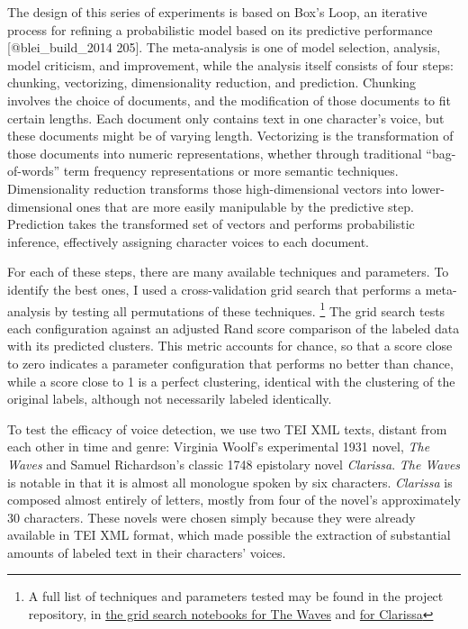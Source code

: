 \documentclass[12pt]{article}
\begin{document}
The design of this series of experiments is based on Box's Loop, an
iterative process for refining a probabilistic model based on its
predictive performance {[}@blei\_build\_2014 205{]}. The meta-analysis
is one of model selection, analysis, model criticism, and improvement,
while the analysis itself consists of four steps: chunking, vectorizing,
dimensionality reduction, and prediction. Chunking involves the choice
of documents, and the modification of those documents to fit certain
lengths. Each document only contains text in one character's voice, but
these documents might be of varying length. Vectorizing is the
transformation of those documents into numeric representations, whether
through traditional ``bag-of-words'' term frequency representations or
more semantic techniques. Dimensionality reduction transforms those
high-dimensional vectors into lower-dimensional ones that are more
easily manipulable by the predictive step. Prediction takes the
transformed set of vectors and performs probabilistic inference,
effectively assigning character voices to each document.

For each of these steps, there are many available techniques and
parameters. To identify the best ones, I used a cross-validation grid
search that performs a meta-analysis by testing all permutations of
these techniques. \footnote{A full list of techniques and parameters
  tested may be found in the project repository, in
  \href{https://github.com/JonathanReeve/character-attribution/blob/master/waves/waves-grid-search-meta.ipynb}{the
  grid search notebooks for The Waves} and
  \href{https://github.com/JonathanReeve/character-attribution/blob/master/clarissa/clarissa-grid-search.ipynb}{for
  Clarissa}} The grid search tests each configuration against an
adjusted Rand score comparison of the labeled data with its predicted
clusters. This metric accounts for chance, so that a score close to zero
indicates a parameter configuration that performs no better than chance,
while a score close to 1 is a perfect clustering, identical with the
clustering of the original labels, although not necessarily labeled
identically.

To test the efficacy of voice detection, we use two TEI XML texts,
distant from each other in time and genre: Virginia Woolf's experimental
1931 novel, \emph{The Waves} and Samuel Richardson's classic 1748
epistolary novel \emph{Clarissa}. \emph{The Waves} is notable in that it
is almost all monologue spoken by six characters. \emph{Clarissa} is
composed almost entirely of letters, mostly from four of the novel's
approximately 30 characters. These novels were chosen simply because
they were already available in TEI XML format, which made possible the
extraction of substantial amounts of labeled text in their characters'
voices.
\end{document}
